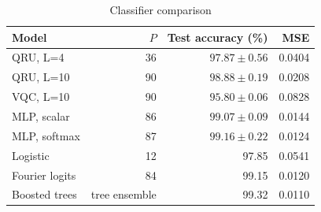\begin{table}[htbp]
\centering
\caption{Classifier comparison}
\label{tab:comparison}
\small
\begin{tabular}{lrrr}
\toprule
Model & $P$ & Test accuracy (\%) & MSE \\
\midrule
QRU, L=4 & 36 & $97.87 \pm 0.56$ & 0.0404 \\
QRU, L=10 & 90 & $98.88 \pm 0.19$ & 0.0208 \\
VQC, L=10 & 90 & $95.80 \pm 0.06$ & 0.0828 \\
MLP, scalar & 86 & $99.07 \pm 0.09$ & 0.0144 \\
MLP, softmax & 87 & $99.16 \pm 0.22$ & 0.0124 \\
Logistic & 12 & 97.85 & 0.0541 \\
Fourier logits & 84 & 99.15 & 0.0120 \\
Boosted trees & tree ensemble & 99.32 & 0.0110 \\
\bottomrule
\end{tabular}
\end{table}
